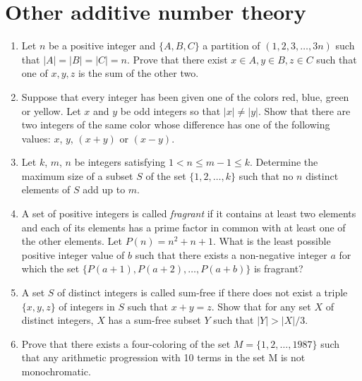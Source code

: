 \documentclass{article}
\begin{document}
\section{Other additive number theory}
\begin{enumerate}
	\item Let $n$ be a positive integer and $\{A, B, C\}$ a partition of $(1, 2,
		      3, \ldots, 3n)$ such that $|A| = |B| = |C| = n$.
	      Prove that there exist $x \in A, y \in B, z \in C$ such that one of $x,
		      y, z$ is the sum of the other two.
	\item Suppose that every integer has been given one of the colors
	      red, blue, green or yellow. Let $x$ and $y$ be odd integers so that
	      $|x| \ne |y|$. Show that there are two integers of the same color whose difference
	      has one of the following values: $x$, $y$, $(x+y)$ or
	      $(x-y)$.

	\item Let $k$, $m$, $n$ be integers satisfying $1 < n \le m-1 \le k$. Determine
	      the maximum size of a subset $S$ of the set $\{1, 2, \ldots, k\}$ such that
	      no $n$ distinct elements of $S$ add up to $m$.

	\item A set of positive integers is called \emph{fragrant} if it contains at least two
	      elements and each of its elements has a prime factor in common with at least
	      one of the other elements. Let $P(n)=n^2+n+1$. What is the least possible
	      positive integer value of $b$ such that there exists a non-negative integer
	      $a$ for which the set $\{P(a+1),P(a+2),\ldots,P(a+b)\}$ is fragrant?

	\item A set $S$ of distinct integers is called sum-free if there does not
	      exist a triple $\{x, y, z\}$ of integers in $S$ such that $x + y = z$. Show
	      that for any set $X$ of distinct integers, $X$ has a sum-free subset
	      $Y$ such that $|Y| > |X|/3$.

	\item Prove that there exists a four-coloring of the set $M = \{1,2,\ldots,1987\}$
	      such that any arithmetic progression with 10 terms in the set M is not
	      monochromatic.
\end{enumerate}
\end{document}
